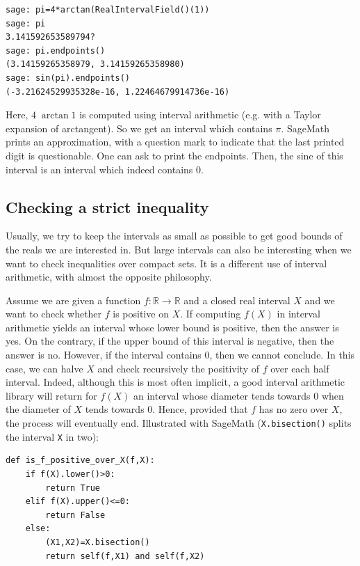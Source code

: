 \documentclass[11pt]{article}
\begin{document}
\begin{verbatim}
sage: pi=4*arctan(RealIntervalField()(1))
sage: pi
3.141592653589794?
sage: pi.endpoints()
(3.14159265358979, 3.14159265358980)
sage: sin(pi).endpoints()
(-3.21624529935328e-16, 1.22464679914736e-16)
\end{verbatim}

Here, $4\;\arctan{1}$ is computed using interval arithmetic (e.g. with a Taylor expansion of arctangent).
So we get an interval which contains $\pi$.
SageMath prints an approximation, with a question mark to indicate that the last printed digit is questionable.
One can ask to print the endpoints.
Then, the sine of this interval is an interval which indeed contains $0$.


\subsection{Checking a strict inequality}
\label{sec:interval_dichotomy}

Usually, we try to keep the intervals as small as possible to get good bounds of the reals we are interested in.
But large intervals can also be interesting when we want to check inequalities over compact sets.
It is a different use of interval arithmetic, with almost the opposite philosophy.

Assume we are given a function $f:\mathbb{R}\to\mathbb{R}$ and a closed real interval $X$ and we want to check whether $f$ is positive on $X$.
If computing $f(X)$ in interval arithmetic yields an interval whose lower bound is positive, then the answer is yes.
On the contrary, if the upper bound of this interval is negative, then the answer is no.
However, if the interval contains $0$, then we cannot conclude.
In this case, we can halve $X$ and check recursively the positivity of $f$ over each half interval.
Indeed, although this is most often implicit, a good interval arithmetic library will return for $f(X)$ an interval whose diameter tends towards $0$ when the diameter of $X$ tends towards $0$.
Hence, provided that $f$ has no zero over $X$, the process will eventually end.
Illustrated with SageMath (\verb+X.bisection()+ splits the interval \verb+X+ in two):

\begin{verbatim}
def is_f_positive_over_X(f,X):
    if f(X).lower()>0:
        return True
    elif f(X).upper()<=0:
        return False
    else:
        (X1,X2)=X.bisection()
        return self(f,X1) and self(f,X2)
\end{verbatim}
\end{document}
